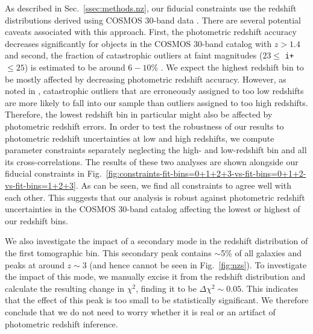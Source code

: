 \documentclass[a4paper,11pt]{article}
\begin{document}
      As described in Sec.~\ref{ssec:methods.nz}, our fiducial constraints use the redshift distributions derived using COSMOS 30-band data \cite{2016ApJS..224...24L}. There are several potential caveats associated with this approach. First, the   photometric redshift accuracy decreases significantly for objects in the COSMOS 30-band catalog with $z > 1.4$ and second, the fraction of catastrophic outliers at faint magnitudes ($23 \leq$ \texttt{i+} $\leq 25$) is estimated to be around $6-10 \%$ \cite{2016ApJS..224...24L}. We expect the highest redshift bin to be mostly affected by decreasing photometric redshift accuracy. However, as noted in \cite{Joudaki:2019}, catastrophic outliers that are erroneously assigned to too low redshifts are more likely to fall into our sample than outliers assigned to too high redshifts. Therefore, the lowest redshift bin in particular might also be affected by photometric redshift errors. In order to test the robustness of our results to photometric redshift uncertainties at low and high redshifts, we compute parameter constraints separately neglecting the high- and low-redshift bin and all its cross-correlations. The results of these two analyses are shown alongside our fiducial constraints in Fig.~\ref{fig:constraints-fit-bins=0+1+2+3-vs-fit-bins=0+1+2-vs-fit-bins=1+2+3}. As can be seen, we find all constraints to agree well with each other. This suggests that our analysis is robust against photometric redshift uncertainties in the COSMOS 30-band catalog affecting the lowest or highest of our redshift bins. 

      We also investigate the impact of a secondary mode in the redshift distribution of the first tomographic bin. This secondary peak contains $\sim$5\% of all galaxies and peaks at around $z\sim 3$ (and hence cannot be seen in Fig.~\ref{fig:nzs}). To investigate the impact of this mode, we manually excise it from the redshift distribution and calculate the resulting change in $\chi^2$, finding it to be $\Delta \chi^2\sim 0.05$. This indicates that the effect of this peak is too small to be statistically significant. We therefore conclude that we do not need to worry whether it is real or an artifact of photometric redshift inference. 
\end{document}
